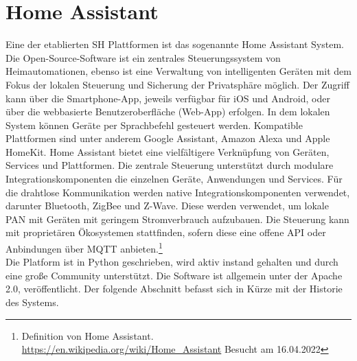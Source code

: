 \section{Home Assistant}
\label{sec:homeassistant}
    Eine der etablierten \acl{SH} Plattformen ist das sogenannte Home Assistant System. Die Open-Source-Software ist ein zentrales 
    Steuerungssystem von Heimautomationen, ebenso ist eine Verwaltung von intelligenten Geräten mit dem Fokus der lokalen Steuerung und Sicherung der 
    Privatsphäre möglich. Der Zugriff kann über die Smartphone-App, jeweils verfügbar für iOS und Android, oder über die webbasierte 
    Benutzeroberfläche (Web-App) erfolgen. In dem lokalen System können Geräte per Sprachbefehl gesteuert werden. Kompatible 
    Plattformen sind unter anderem Google Assistant, Amazon Alexa und Apple HomeKit. %
    Home Assistant bietet eine vielfältigere Verknüpfung von Geräten, Services und Plattformen. Die zentrale Steuerung 
    unterstützt durch modulare Integrationskomponenten die einzelnen Geräte, Anwendungen und Services. Für die drahtlose Kommunikation 
    werden native Integrationskomponenten verwendet, darunter Bluetooth, ZigBee und Z-Wave. Diese werden verwendet, um lokale \ac{PAN} mit 
    Geräten mit geringem Stromverbrauch aufzubauen. Die Steuerung kann mit proprietären Ökosystemen stattfinden, sofern diese eine offene 
    \acs{API} oder Anbindungen über \acs{MQTT} anbieten.\footnote{Definition von Home Assistant. \url{https://en.wikipedia.org/wiki/Home_Assistant} Besucht am 16.04.2022}
    \\
    Die Platform ist in Python geschrieben, wird aktiv instand gehalten und durch eine große Community unterstützt. Die Software ist allgemein unter 
    der Apache 2.0, veröffentlicht. Der folgende Abschnitt befasst sich in Kürze mit der Historie des Systems. 
    
